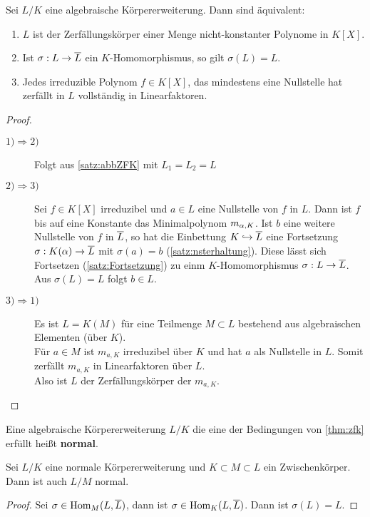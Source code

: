 	\begin{theorem}\label{thm:zfk}
		Sei $L/K$ eine algebraische Körpererweiterung. Dann sind äquivalent:\begin{enumerate}
			\item $L$ ist der Zerfällungskörper einer Menge nicht-konstanter Polynome in $K[X]$.
			\item Ist $\sigma:L\to\overline{L}$ ein $K$-Homomorphismus, so gilt $\sigma(L)=L$.
			\item Jedes irreduzible Polynom $f\in K[X]$, das mindestens eine Nullstelle hat zerfällt in $L$ vollständig in Linearfaktoren.
		\end{enumerate}
	\end{theorem}
	\begin{proof}
		\begin{description}
			\item[$1)\Rightarrow 2)$] Folgt aus \ref{satz:abbZFK} mit $L_1=L_2=L$
			\item[$2)\Rightarrow 3)$] Sei $f\in K[X]$ irreduzibel und $a\in L$ eine Nullstelle von $f$ in $L$. Dann ist $f$ bis auf eine Konstante das Minimalpolynom $m_{\alpha,K}$. Ist $b$ eine weitere Nullstelle von $f$ in $\overline{L}$, so hat die Einbettung $K\hookrightarrow\overline{L}$ eine Fortsetzung $\sigma:K(\alpha)\to\overline{L}$ mit $\sigma(a)=b$ (\ref{satz:nsterhaltung}). Diese lässt sich Fortsetzen (\ref{satz:Fortsetzung}) zu einm $K$-Homomorphismus $\sigma:L\to \overline{L}$.\\
			Aus $\sigma(L)=L$ folgt $b\in L$.
			\item[$3)\Rightarrow1)$] Es ist $L=K(M)$ für eine Teilmenge $M\subset L$ bestehend aus algebraischen Elementen (über $K$).\\
			Für $a\in M$ ist $m_{a,K}$ irreduzibel über $K$ und hat $a$ als Nullstelle in $L$. Somit zerfällt $m_{a,K}$ in Linearfaktoren über $L$.\\
			Also ist $L$ der Zerfällungskörper der $m_{a,K}$.
		\end{description}
	\end{proof}

	\begin{definition}
		Eine algebraische Körpererweiterung $L/K$ die eine der Bedingungen von \ref{thm:zfk} erfüllt heißt \textbf{normal}.
	\end{definition}

	\begin{satz}
		Sei $L/K$ eine normale Körpererweiterung und $K\subset M\subset L$ ein Zwischenkörper. Dann ist auch $L/M$ normal.
	\end{satz}
	\begin{proof}
		Sei $\sigma\in\operatorname{Hom}_M(L,\overline{L})$, dann ist $\sigma\in \operatorname{Hom}_K(L,\overline{L})$. Dann ist $\sigma(L)=L$.
	\end{proof}

